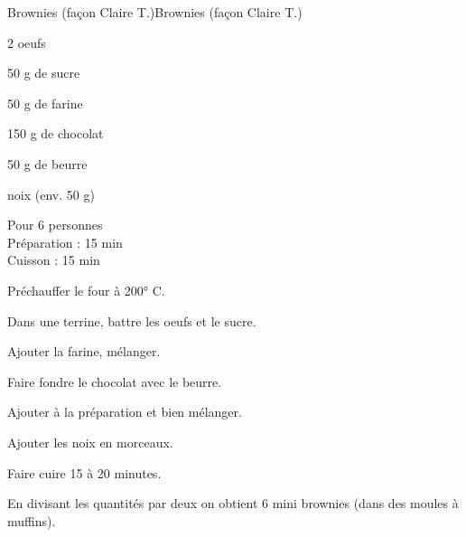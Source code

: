 \begin{recette}{Brownies (façon Claire T.)}{Brownies (façon Claire T.)}

\begin{ingredients}
2 oeufs\par
50 g de sucre\par
50 g de farine\par
150 g de chocolat\par
50 g de beurre\par
noix (env. 50 g)\par
\end{ingredients}

\begin{infos}
Pour 6 personnes\\
Préparation : 15 min\\
Cuisson : 15 min\\
\end{infos}

\begin{etapes}
\item Préchauffer le four à 200° C.
\item Dans une terrine, battre les oeufs et le sucre.
\item Ajouter la farine, mélanger.
\item Faire fondre le chocolat avec le beurre.
\item Ajouter à la préparation et bien mélanger.
\item Ajouter les noix en morceaux.
\item Faire cuire 15 à 20 minutes.
\end{etapes}

\begin{conseils}
En divisant les quantités par deux on obtient 6 mini brownies (dans des moules à muffins).
\end{conseils}

\end{recette}